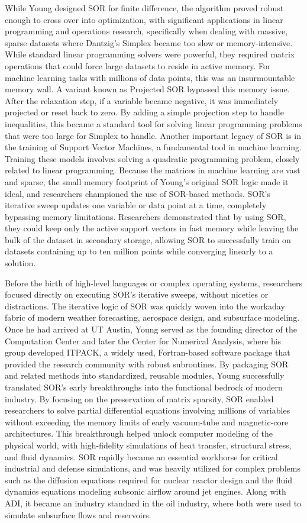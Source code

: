 While Young designed SOR for finite difference, the algorithm proved robust enough to cross over into optimization, with significant applications in linear programming and operations research, specifically when dealing with massive, sparse datasets where Dantzig’s Simplex became too slow or memory-intensive. While standard linear programming solvers were powerful, they required matrix operations that could force large datasets to reside in active memory. For machine learning tasks with millions of data points, this was an insurmountable memory wall. A variant known as Projected SOR bypassed this memory issue. After the relaxation step, if a variable became negative, it was immediately projected or reset back to zero. By adding a simple projection step to handle inequalities, this became a standard tool for solving linear programming problems that were too large for Simplex to handle. Another important legacy of SOR is in the training of Support Vector Machines, a fundamental tool in machine learning. Training these models involves solving a quadratic programming problem, closely related to linear programming. Because the matrices in machine learning are vast and sparse, the small memory footprint of Young's original SOR logic made it ideal, and researchers championed the use of SOR-based methods. SOR’s iterative sweep updates one variable or data point at a time, completely bypassing memory limitations. Researchers demonstrated that by using SOR, they could keep only the active support vectors in fast memory while leaving the bulk of the dataset in secondary storage, allowing SOR to successfully train on datasets containing up to ten million points while converging linearly to a solution. 

Before the birth of high-level languages or complex operating systems, researchers focused directly on executing SOR’s iterative sweeps, without niceties or distractions. The iterative logic of SOR was quickly woven into the workaday fabric of modern weather forecasting, aerospace design, and subsurface modeling. Once he had arrived at UT Austin, Young served as the founding director of the Computation Center and later the Center for Numerical Analysis, where his group developed ITPACK, a widely used, Fortran-based software package that provided the research community with robust subroutines. By packaging SOR and related methods into standardized, reusable modules, Young successfully translated SOR’s early breakthroughs into the functional bedrock of modern industry. By focusing on the preservation of matrix sparsity, SOR enabled researchers to solve partial differential equations involving millions of variables without exceeding the memory limits of early vacuum-tube and magnetic-core architectures. This breakthrough helped unlock computer modeling of the physical world, with high-fidelity simulations of heat transfer, structural stress, and fluid dynamics. SOR rapidly became an essential workhorse for critical industrial and defense simulations, and was heavily utilized for complex problems such as the diffusion equations required for nuclear reactor design and the fluid dynamics equations modeling subsonic airflow around jet engines. Along with ADI, it became an industry standard in the oil industry, where both were used to simulate subsurface flows and reservoirs.

